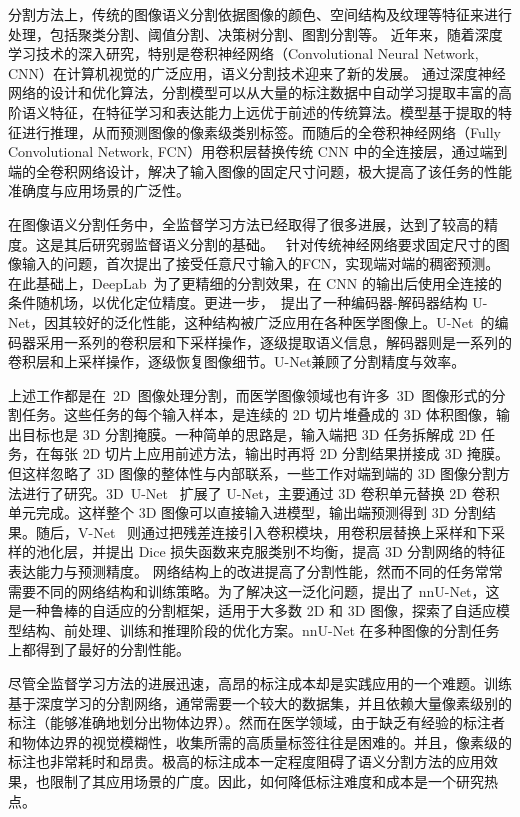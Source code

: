分割方法上，传统的图像语义分割依据图像的颜色、空间结构及纹理等特征来进行处理，包括聚类分割\citep{coates2012learning}、阈值分割\citep{ying2005fast}、决策树分割\citep{shotton2008semantic}、图割分割\citep{vicente2008graph}等。
近年来，随着深度学习技术的深入研究，特别是卷积神经网络（Convolutional Neural Network, CNN）在计算机视觉的广泛应用，语义分割技术迎来了新的发展。
通过深度神经网络的设计和优化算法，分割模型可以从大量的标注数据中自动学习提取丰富的高阶语义特征，在特征学习和表达能力上远优于前述的传统算法。模型基于提取的特征进行推理，从而预测图像的像素级类别标签。而随后的全卷积神经网络（Fully Convolutional Network, FCN）用卷积层替换传统 CNN 中的全连接层，通过端到端的全卷积网络设计，解决了输入图像的固定尺寸问题，极大提高了该任务的性能准确度与应用场景的广泛性。%

在图像语义分割任务中，全监督学习方法已经取得了很多进展，达到了较高的精度。这是其后研究弱监督语义分割的基础。
\citet{long2015fully}~针对传统神经网络要求固定尺寸的图像输入的问题，首次提出了接受任意尺寸输入的FCN，实现端对端的稠密预测。在此基础上，DeepLab~为了更精细的分割效果，在 CNN 的输出后使用全连接的条件随机场，以优化定位精度。更进一步，\citet{ronneberger2015u}~提出了一种编码器-解码器结构 U-Net，因其较好的泛化性能，这种结构被广泛应用在各种医学图像上。U-Net~的编码器采用一系列的卷积层和下采样操作，逐级提取语义信息，解码器则是一系列的卷积层和上采样操作，逐级恢复图像细节。U-Net兼顾了分割精度与效率。

上述工作都是在~2D~图像处理分割，而医学图像领域也有许多~3D~图像形式的分割任务。这些任务的每个输入样本，是连续的 2D 切片堆叠成的 3D 体积图像，输出目标也是 3D 分割掩膜。一种简单的思路是，输入端把 3D 任务拆解成 2D 任务，在每张 2D 切片上应用前述方法，输出时再将 2D 分割结果拼接成 3D 掩膜。但这样忽略了 3D 图像的整体性与内部联系，一些工作对端到端的 3D 图像分割方法进行了研究。3D~U-Net~\citep{cciccek20163d} 扩展了 U-Net，主要通过 3D 卷积单元替换 2D 卷积单元完成。这样整个 3D 图像可以直接输入进模型，输出端预测得到 3D 分割结果。随后，V-Net~\citep{milletari2016v} 则通过把残差连接引入卷积模块，用卷积层替换上采样和下采样的池化层，并提出 Dice 损失函数来克服类别不均衡，提高 3D 分割网络的特征表达能力与预测精度。
网络结构上的改进提高了分割性能，然而不同的任务常常需要不同的网络结构和训练策略。为了解决这一泛化问题，\citet{isensee2019automated}提出了 nnU-Net，这是一种鲁棒的自适应的分割框架，适用于大多数 2D 和 3D 图像，探索了自适应模型结构、前处理、训练和推理阶段的优化方案。nnU-Net 在多种图像的分割任务上都得到了最好的分割性能。

尽管全监督学习方法的进展迅速，高昂的标注成本却是实践应用的一个难题。训练基于深度学习的分割网络，通常需要一个较大的数据集，并且依赖大量像素级别的标注（能够准确地划分出物体边界）。然而在医学领域，由于缺乏有经验的标注者和物体边界的视觉模糊性，收集所需的高质量标签往往是困难的。并且，像素级的标注也非常耗时和昂贵。极高的标注成本一定程度阻碍了语义分割方法的应用效果，也限制了其应用场景的广度。因此，如何降低标注难度和成本是一个研究热点。

